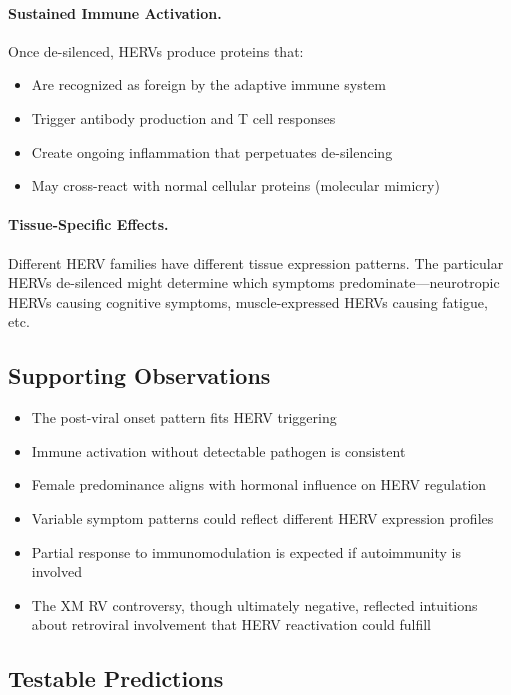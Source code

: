 \paragraph{Sustained Immune Activation.} Once de-silenced, HERVs produce proteins that:
\begin{itemize}
    \item Are recognized as foreign by the adaptive immune system
    \item Trigger antibody production and T cell responses
    \item Create ongoing inflammation that perpetuates de-silencing
    \item May cross-react with normal cellular proteins (molecular mimicry)
\end{itemize}

\paragraph{Tissue-Specific Effects.} Different HERV families have different tissue expression patterns. The particular HERVs de-silenced might determine which symptoms predominate---neurotropic HERVs causing cognitive symptoms, muscle-expressed HERVs causing fatigue, etc.

\subsection{Supporting Observations}

\begin{itemize}
    \item The post-viral onset pattern fits HERV triggering
    \item Immune activation without detectable pathogen is consistent
    \item Female predominance aligns with hormonal influence on HERV regulation
    \item Variable symptom patterns could reflect different HERV expression profiles
    \item Partial response to immunomodulation is expected if autoimmunity is involved
    \item The XM RV controversy, though ultimately negative, reflected intuitions about retroviral involvement that HERV reactivation could fulfill
\end{itemize}

\subsection{Testable Predictions}

